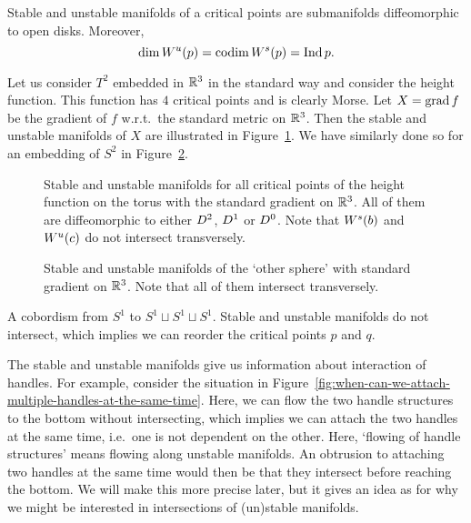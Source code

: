 \begin{prop}
    Stable and unstable manifolds of a critical points are submanifolds diffeomorphic to open disks. Moreover,
    \[
        \dim W^u(p) = \operatorname{codim} W^s(p) = \operatorname{Ind} p
    .\] 
\end{prop}

\begin{eg}
    Let us consider $T^{2}$ embedded in $\mathbb{R}^3$ in the standard way and consider the height function. 
    This function has $4$ critical points and is clearly Morse.
    Let $X = \operatorname{grad} f$ be the gradient of $f$ w.r.t.\ the standard metric on $\mathbb{R}^{3}$.
    Then the stable and unstable manifolds of $X$ are illustrated in Figure~\ref{fig:torus-height-function-stable-and-unstable-manifolds}.
    \label{eg:torus-stable-unstable-manifolds-standard-gradient}
    We have similarly done so for an embedding of $S^2$ in Figure~\ref{fig:other-sphere-definition-of-mathcal-m}.
\end{eg}

    \begin{figure}[H]
        \centering
        \caption{
        Stable and unstable manifolds for all critical points of the height function on the torus with the standard gradient on $\mathbb{R}^3$.
    All of them are diffeomorphic to either $D^{2}$, $D^{1}$ or  $D^{0}$.
    Note that $W^s(b)$ and  $W^u(c)$ do not intersect transversely.
}
        \label{fig:torus-height-function-stable-and-unstable-manifolds}
    \end{figure}

    \begin{figure}[H]
        \centering
        \caption{
            Stable and unstable manifolds of the `other sphere' with standard gradient on $\mathbb{R}^3$.  Note that all of them intersect transversely.
        }
        \label{fig:other-sphere-definition-of-mathcal-m}
    \end{figure}


    \begin{marginfigure}
        \centering
        \caption{
            A cobordism from $S^{1}$ to $S^{1} \sqcup S^1 \sqcup S^1$.
            Stable and unstable manifolds do not intersect, which implies we can reorder the critical points $p$ and $q$.
        }
        \label{fig:when-can-we-attach-multiple-handles-at-the-same-time}
    \end{marginfigure}
    The stable and unstable manifolds give us information about interaction of handles.
    For example, consider the situation in Figure~\ref{fig:when-can-we-attach-multiple-handles-at-the-same-time}.
    Here, we can flow the two handle structures to the bottom without intersecting, which implies we can attach the two handles at the same time, i.e.\ one is not dependent on the other.
    Here, `flowing of handle structures' means flowing along unstable manifolds.
    An obtrusion to attaching two handles at the same time would then be that they intersect before reaching the bottom. We will make this more precise later, but it gives an idea as for why we might be interested in intersections of (un)stable manifolds.

